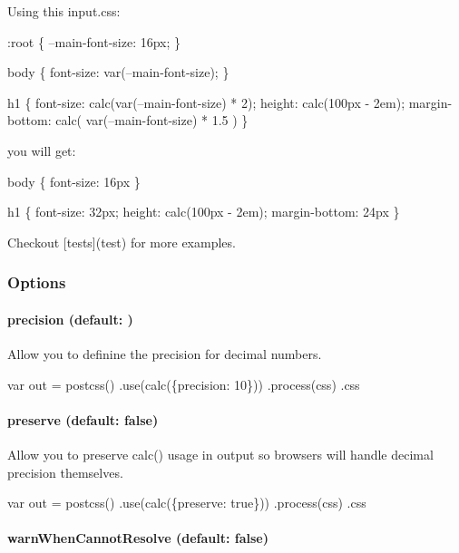 Using this {\ttfamily input.\+css}\+:


\begin{DoxyCode}
:root \{
  --main-font-size: 16px;
\}

body \{
  font-size: var(--main-font-size);
\}

h1 \{
  font-size: calc(var(--main-font-size) * 2);
  height: calc(100px - 2em);
  margin-bottom: calc(
      var(--main-font-size)
      * 1.5
    )
\}
\end{DoxyCode}


you will get\+:


\begin{DoxyCode}
body \{
  font-size: 16px
\}

h1 \{
  font-size: 32px;
  height: calc(100px - 2em);
  margin-bottom: 24px
\}
\end{DoxyCode}


Checkout \mbox{[}tests\mbox{]}(test) for more examples.

\subsubsection*{Options}

\paragraph*{{\ttfamily precision} (default\+: {})}

Allow you to definine the precision for decimal numbers.


\begin{DoxyCode}
var out = postcss()
  .use(calc(\{precision: 10\}))
  .process(css)
  .css
\end{DoxyCode}


\paragraph*{{\ttfamily preserve} (default\+: {\ttfamily false})}

Allow you to preserve calc() usage in output so browsers will handle decimal precision themselves.


\begin{DoxyCode}
var out = postcss()
  .use(calc(\{preserve: true\}))
  .process(css)
  .css
\end{DoxyCode}


\paragraph*{{\ttfamily warn\+When\+Cannot\+Resolve} (default\+: {\ttfamily false})}

